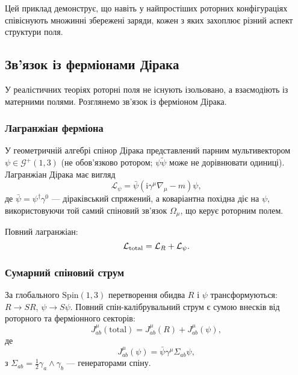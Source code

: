 \documentclass[11pt,a4paper]{article}
\numberwithin{equation}{section}
\theoremstyle{plain}
\theoremstyle{definition}
\theoremstyle{remark}
\newcommand{\ii}{\mathrm{i}}
\begin{document}
Цей приклад демонструє, що навіть у найпростіших роторних конфігураціях співіснують множинні збережені заряди, кожен з яких захоплює різний аспект структури поля.

\subsection{Зв'язок із ферміонами Дірака}

У реалістичних теоріях роторні поля не існують ізольовано, а взаємодіють із матерними полями. Розглянемо зв'язок із ферміоном Дірака.

\subsubsection{Лагранжіан ферміона}

У геометричній алгебрі спінор Дірака представлений парним мультивектором $\psi \in \mathcal{G}^+(1,3)$ (не обов'язково ротором; $\psi\widetilde{\psi}$ може не дорівнювати одиниці). Лагранжіан Дірака має вигляд
\begin{equation}
\mathcal{L}_\psi = \bar{\psi}(\ii\gamma^\mu\nabla_\mu - m)\psi,
\end{equation}
де $\bar{\psi} = \psi^\dagger\gamma^0$ — діраківський спряжений, а коваріантна похідна діє на $\psi$, використовуючи той самий спіновий зв'язок $\Omega_\mu$, що керує роторним полем.

Повний лагранжіан:
\begin{equation}
\mathcal{L}_{\rm total} = \mathcal{L}_R + \mathcal{L}_\psi.
\end{equation}

\subsubsection{Сумарний спіновий струм}

За глобального $\mathrm{Spin}(1,3)$ перетворення обидва $R$ і $\psi$ трансформуються: $R \to SR$, $\psi \to S\psi$. Повний спін-калібрувальний струм є сумою внесків від роторного та ферміонного секторів:
\begin{equation}
J^\mu_{ab}(\text{total}) = J^\mu_{ab}(R) + J^\mu_{ab}(\psi),
\end{equation}
де
\begin{equation}
J^\mu_{ab}(\psi) = \bar{\psi}\gamma^\mu\Sigma_{ab}\psi,
\end{equation}
з $\Sigma_{ab} = \frac{1}{2}\gamma_a\wedge\gamma_b$ — генераторами спіну.
\end{document}
